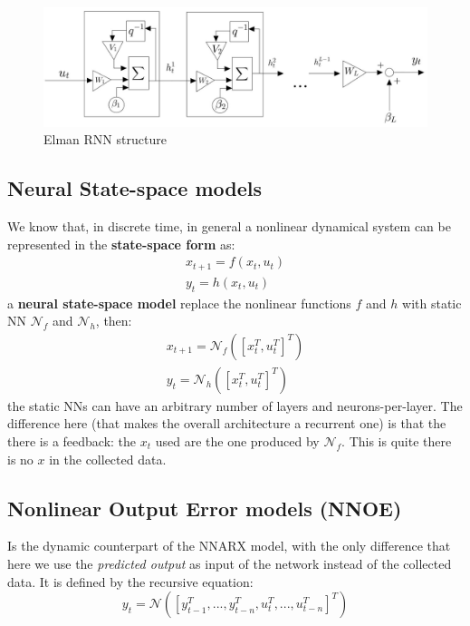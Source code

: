 \begin{figure}[h]
    \centering
    \includegraphics[scale=0.28]{img/RNN.jpeg}
    \caption{Elman RNN structure} 
\end{figure}

\subsection{Neural State-space models}
We know that, in discrete time, in general a nonlinear dynamical system can be represented in the \textbf{state-space form} as:
\begin{align*}
    x_{t+1}=f(x_t,u_t)\\
    y_t=h(x_t,u_t)
\end{align*}
a \textbf{neural state-space model} replace the nonlinear functions $f$ and $h$ with static NN $\mathcal{N}_f$ and $\mathcal{N}_h$, then: 
\begin{align*}
    x_{t+1}=\mathcal{N}_f([x_t^T,u_t^T]^T)\\
    y_t=\mathcal{N}_h([x_t^T,u_t^T]^T)
\end{align*}
the static NNs can have an arbitrary number of layers and neurons-per-layer. The difference here (that makes the overall architecture a recurrent one) is that the there is a feedback: the $x_t$ used are the one produced by $\mathcal{N}_f$. This is quite there is no $x$ in the collected data.

\subsection{Nonlinear Output Error models (NNOE)}
Is the dynamic counterpart of the NNARX model, with the only difference that here we use the \textit{predicted output} as input of the network instead of the collected data. It is defined by the recursive equation:
\begin{equation*}
    y_t=\mathcal{N}([y_{t-1}^T,...,y_{t-n}^T,u_t^T,...,u_{t-n}^T]^T)
\end{equation*}

